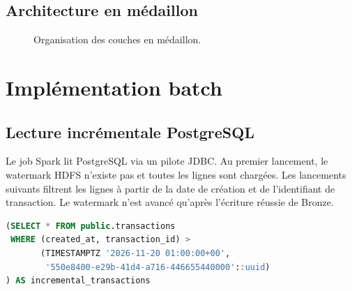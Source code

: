 \documentclass[11pt,a4paper]{report}
\begin{document}
\section{Architecture en médaillon}
\begin{figure}[H]
\centering
{}
\caption{Organisation des couches en médaillon.}
\label{fig:medallion}
\end{figure}

\chapter{Implémentation batch}

\section{Lecture incrémentale PostgreSQL}
Le job Spark lit PostgreSQL via un pilote JDBC. Au premier lancement, le
watermark HDFS n'existe pas et toutes les lignes sont chargées. Les lancements
suivants filtrent les lignes à partir de la date de création et de l'identifiant
de transaction.
Le watermark n'est avancé qu'après l'écriture réussie de Bronze.

\begin{lstlisting}[language=SQL,caption={Lecture incrémentale JDBC dans Spark}]
(SELECT * FROM public.transactions
 WHERE (created_at, transaction_id) >
       (TIMESTAMPTZ '2026-11-20 01:00:00+00',
        '550e8400-e29b-41d4-a716-446655440000'::uuid)
) AS incremental_transactions
\end{lstlisting}
\end{document}
